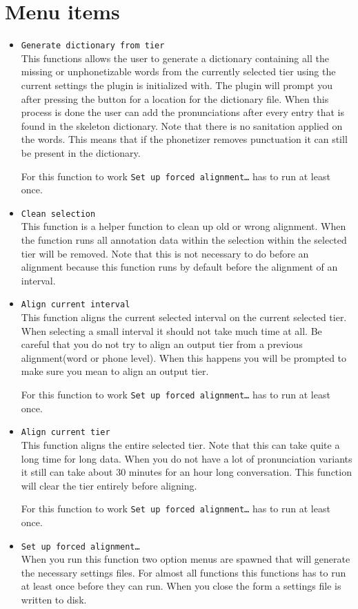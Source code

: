 \section{Menu items}
\begin{itemize}
	\item \texttt{Generate dictionary from tier}\\
		This functions allows the user to generate a dictionary containing all the
		missing or unphonetizable words from the currently selected tier using the
		current settings the plugin is initialized with. The plugin will prompt you
		after pressing the button for a location for the dictionary file. When this
		process is done the user can add the pronunciations after every entry that
		is found in the skeleton dictionary. Note that there is no sanitation
		applied on the words. This means that if the phonetizer removes punctuation
		it can still be present in the dictionary.

		For this function to work \texttt{Set up forced alignment\ldots} has to run
		at least once.
	\item \texttt{Clean selection}\\
		This function is a helper function to clean up old or wrong alignment. When
		the function runs all annotation data within the selection within the
		selected tier will be removed. Note that this is not necessary to do before
		an alignment because this function runs by default before the alignment of
		an interval.
	\item \texttt{Align current interval}\\
		This function aligns the current selected interval on the current selected
		tier. When selecting a small interval it should not take much time at all.
		Be careful that you do not try to align an output tier from a previous
		alignment(word or phone level). When this happens you will be prompted to
		make sure you mean to align an output tier.

		For this function to work \texttt{Set up forced alignment\ldots} has to run
		at least once.
	\item \texttt{Align current tier}\\
		This function aligns the entire selected tier. Note that this can take
		quite a long time for long data. When you do not have a lot of
		pronunciation variants it still can take about $30$ minutes for an hour
		long conversation. This function will clear the tier entirely before
		aligning.

		For this function to work \texttt{Set up forced alignment\ldots} has to run
		at least once.
	\item \texttt{Set up forced alignment\ldots}\\
		When you run this function two option menus are spawned that will generate
		the necessary settings files. For almost all functions this functions has
		to run at least once before they can run. When you close the form a
		settings file is written to disk.


\end{itemize}
